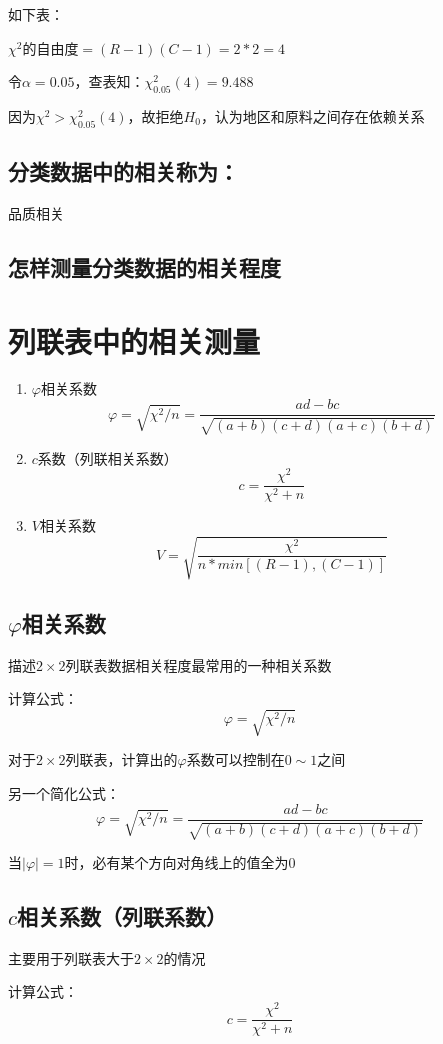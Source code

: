 \documentclass[UTF8,10pt]{book}
\begin{document}
如下表： 

$\chi^2$的自由度$=(R-1)(C-1)=2*2=4$ 

令$\alpha=0.05$，查表知：$\chi^2_{0.05}(4)=9.488$ 

因为$\chi^2>\chi^2_{0.05}(4)$，故拒绝$H_0$，认为地区和原料之间存在依赖关系	

\subsection{分类数据中的相关称为：}	品质相关	

\subsection{怎样测量分类数据的相关程度}	

\section{列联表中的相关测量}

\begin{enumerate}
	\item $\varphi $相关系数 
	$$\varphi = \sqrt{\chi^2/n} = \frac{ad-bc}{\sqrt{(a+b)(c+d)(a+c)(b+d)}}$$ 
	\item $c$系数（列联相关系数） 
	$$c = \frac{\chi^2}{\chi^2 + n}$$ 
	\item $V$相关系数 
	$$V = \sqrt{\frac{\chi^2}{n*min[(R-1),(C-1)]}}$$

\end{enumerate} 

\subsection{$\varphi$相关系数}	
描述$2\times 2$列联表数据相关程度最常用的一种相关系数 

计算公式： $$\varphi = \sqrt{\chi^2/n}$$ 

对于$2\times 2$列联表，计算出的$\varphi$系数可以控制在$0\sim1$之间 

另一个简化公式： 
$$\varphi = \sqrt{\chi^2/n} = \frac{ad-bc}{\sqrt{(a+b)(c+d)(a+c)(b+d)}}$$ 

当$|\varphi|=1$时，必有某个方向对角线上的值全为0	


\subsection{$c$相关系数（列联系数）}	
主要用于列联表大于$2\times 2$的情况 

计算公式： $$c = \frac{\chi^2}{\chi^2 + n}$$ 
\end{document}
